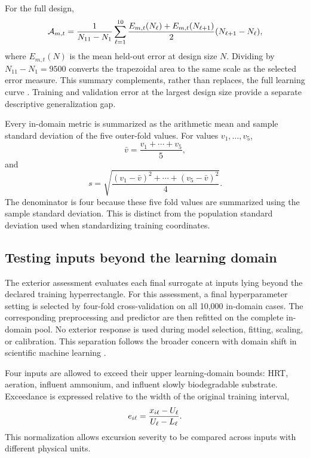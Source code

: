 For the full design,
\begin{equation}
\equationname{Normalized trapezoidal area under a learning curve}
\mathcal{A}_{m,t}=
\frac{1}{N_{11}-N_1}
\sum_{\ell=1}^{10}\frac{E_{m,t}(N_\ell)+E_{m,t}(N_{\ell+1})}{2}
(N_{\ell+1}-N_\ell),
\label{eq:projection_learning_curve_area}
\end{equation}
where $E_{m,t}(N)$ is the mean held-out error at design size $N$. Dividing by $N_{11}-N_1=9500$ converts the trapezoidal area to the same scale as the selected error measure. This summary complements, rather than replaces, the full learning curve \citep{VieringLoog2023}. Training and validation error at the largest design size provide a separate descriptive generalization gap.

Every in-domain metric is summarized as the arithmetic mean and sample standard deviation of the five outer-fold values. For values $v_1,\ldots,v_5$,
\[
\bar v=\frac{v_1+\cdots+v_5}{5},
\]
and
\[
s=
\sqrt{
\frac{
(v_1-\bar v)^2+\cdots+(v_5-\bar v)^2
}{4}
}.
\]
The denominator is four because these five fold values are summarized using the sample standard deviation. This is distinct from the population standard deviation used when standardizing training coordinates.

\subsection{Testing inputs beyond the learning domain}

The exterior assessment evaluates each final surrogate at inputs lying beyond the declared training hyperrectangle. For this assessment, a final hyperparameter setting is selected by four-fold cross-validation on all 10,000 in-domain cases. The corresponding preprocessing and predictor are then refitted on the complete in-domain pool. No exterior response is used during model selection, fitting, scaling, or calibration. This separation follows the broader concern with domain shift in scientific machine learning \citep{Karniadakis2021,Shen2023}.

Four inputs are allowed to exceed their upper learning-domain bounds: HRT, aeration, influent ammonium, and influent slowly biodegradable substrate. Exceedance is expressed relative to the width of the original training interval,
\begin{equation}
\equationname{Input exceedance beyond an upper training-domain bound}
e_{i\ell}=\frac{x_{i\ell}-U_\ell}{U_\ell-L_\ell}.
\label{eq:projection_domain_exceedance}
\end{equation}
This normalization allows excursion severity to be compared across inputs with different physical units.


